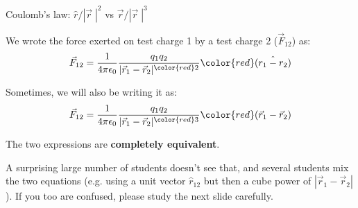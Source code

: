 %
%
%

\begin{frame}{Coulomb's law: $\hat{r}/|\vec{r}\;|^2$ vs $\vec{r}/|\vec{r}\;|^3$}

We wrote the force exerted on test charge 1 by a test charge 2 ($\vec{F}_{12}$) as:\\
{\Large
\begin{equation*}
   \vec{F}_{12} =
      \frac{1}{4\pi\epsilon_0}
      \frac{q_1 q_2}{|\vec{r}_{1}-\vec{r}_{2}|^{\color{red}2}}
      {\color{red} \hat{(r_{1}-r_{2})}}
\end{equation*}
}
\vspace{0.2cm}

Sometimes, we will also be writing it as:\\
{\Large
\begin{equation*}
   \vec{F}_{12} =
      \frac{1}{4\pi\epsilon_0}
      \frac{q_1 q_2}{|\vec{r}_{1}-\vec{r}_{2}|^{\color{red}3}}
      {\color{red} (\vec{r}_{1}-\vec{r}_{2})}
\end{equation*}
}
\vspace{0.2cm}

The two expressions are {\bf completely equivalent}.\\
\vspace{0.2cm}

{\small
A surprising large number of students doesn't see that, and several students mix the two equations
(e.g. using a unit vector $\hat{r}_{12}$ but then a cube power of $|\vec{r}_{1}-\vec{r}_{2}|$).
If you too are confused, please study the next slide carefully.
}

\end{frame}

%
%
%

